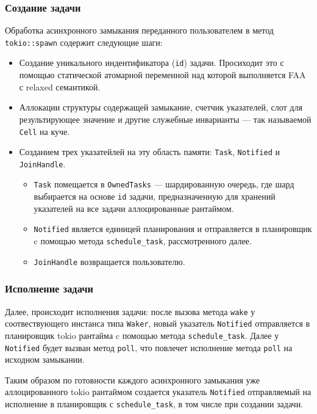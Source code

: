 \subsubsection{Создание задачи}

Обработка асинхронного замыкания переданного пользователем в метод \verb|tokio::spawn| содержит следующие шаги:

\begin{itemize}
    \item Создание уникального индентификатора (\verb|id|) задачи. Просиходит это с помощью статической атомарной переменной над которой выполняется FAA с relaxed семантикой.
    \item Аллокации структуры содержащей замыкание, счетчик указателей, слот для результирующее значение и другие служебные инварианты --- так называемой \verb|Cell| на куче.
    \item Созданием трех указатейлей на эту область памяти: \verb|Task|, \verb|Notified| и \verb|JoinHandle|.
    \begin{itemize}
        \item \verb|Task| помещается в \verb|OwnedTasks| --- шардированную очередь, где шард выбирается на основе \verb|id| задачи, предназначенную для хранений указателей на все задачи аллоцированные рантаймом.
        \item \verb|Notified| является единицей планирования и отправляется в планировщик c помощью метода \verb|schedule_task|, рассмотренного далее.
        \item \verb|JoinHandle| возвращается пользователю.
    \end{itemize}
\end{itemize}

\subsubsection{Исполнение задачи}

Далее, происходит исполнения задачи: после вызова метода \verb|wake| у соотвествующего инстанса типа \verb|Waker|, новый указатель \verb|Notified| отправляется в планировщик tokio рантайма c помощью метода \verb|schedule_task|. Далее у \verb|Notified| будет вызван метод \verb|poll|, что повлечет исполнение метода \verb|poll| на исходном замыкании.

Таким образом по готовности каждого асинхронного замыкания уже аллоцированного tokio рантаймом создается указатель \verb|Notified| отправляемый на исполнение в планировщик с \verb|schedule_task|, в том числе при создании задачи.


